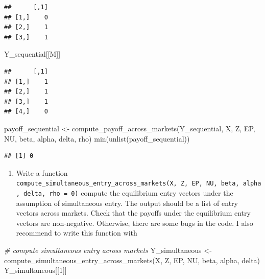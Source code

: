 \documentclass[
]{book}
\newenvironment{Shaded}{\begin{snugshade}}{\end{snugshade}}
\newcommand{\CommentTok}[1]{\textcolor[rgb]{0.56,0.35,0.01}{\textit{#1}}}
\newcommand{\DecValTok}[1]{\textcolor[rgb]{0.00,0.00,0.81}{#1}}
\newcommand{\FunctionTok}[1]{\textcolor[rgb]{0.00,0.00,0.00}{#1}}
\newcommand{\NormalTok}[1]{#1}
\newcommand{\OtherTok}[1]{\textcolor[rgb]{0.56,0.35,0.01}{#1}}
\providecommand{\tightlist}{%
  \setlength{\itemsep}{0pt}\setlength{\parskip}{0pt}}
\begin{document}
\begin{verbatim}
##      [,1]
## [1,]    0
## [2,]    1
## [3,]    1
\end{verbatim}

\begin{Shaded}
\begin{Highlighting}[]
\NormalTok{Y\_sequential[[M]]}
\end{Highlighting}
\end{Shaded}

\begin{verbatim}
##      [,1]
## [1,]    1
## [2,]    1
## [3,]    1
## [4,]    0
\end{verbatim}

\begin{Shaded}
\begin{Highlighting}[]
\NormalTok{payoff\_sequential }\OtherTok{\textless{}{-}}
  \FunctionTok{compute\_payoff\_across\_markets}\NormalTok{(Y\_sequential, X, Z, EP, NU, beta, alpha, delta, rho)}
\FunctionTok{min}\NormalTok{(}\FunctionTok{unlist}\NormalTok{(payoff\_sequential))}
\end{Highlighting}
\end{Shaded}

\begin{verbatim}
## [1] 0
\end{verbatim}

\begin{enumerate}
\def\labelenumi{\arabic{enumi}.}
\setcounter{enumi}{7}
\tightlist
\item
  Write a function \texttt{compute\_simultaneous\_entry\_across\_markets(X,\ Z,\ EP,\ NU,\ beta,\ alpha,\ delta,\ rho\ =\ 0)} compute the equilibrium entry vectors under the assumption of simultaneous entry. The output should be a list of entry vectors across markets. Check that the payoffs under the equilibrium entry vectors are non-negative. Otherwise, there are some bugs in the code. I also recommend to write this function with
\end{enumerate}

\begin{Shaded}
\begin{Highlighting}[]
\CommentTok{\# compute simultaneous entry across markets}
\NormalTok{Y\_simultaneous }\OtherTok{\textless{}{-}}
  \FunctionTok{compute\_simultaneous\_entry\_across\_markets}\NormalTok{(X, Z, EP, NU, beta, alpha, delta)}
\NormalTok{Y\_simultaneous[[}\DecValTok{1}\NormalTok{]]}
\end{Highlighting}
\end{Shaded}
\end{document}
